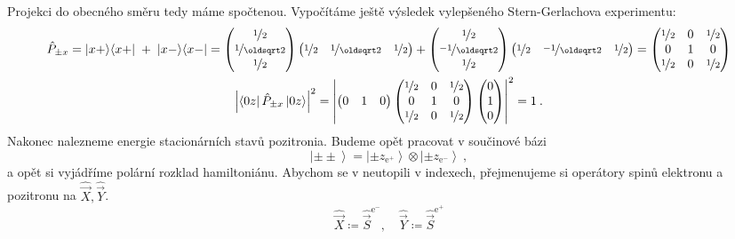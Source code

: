 \documentclass[10pt,a4paper]{article}
\newcommand{\const}[1]{\text{#1}}
\newcommand{\mat}[1]{
    \begin{pmatrix}
        #1
    \end{pmatrix}
}
\newcommand{\bra}[1]{\left< #1 \right|}
\newcommand{\ket}[1]{\left| #1 \right>}
\begin{document}
Projekci do obecného směru tedy máme spočtenou. Vypočítáme ještě výsledek vylepšeného Stern-Gerlachova experimentu:
\begin{gather*}
    \hat P_{\pm x}
    = \ket{x+}\!\bra{x+} \;+\; \ket{x-}\!\bra{x-}
    = \mat{
        \nicefrac{1}{2} \\
        \nicefrac{1}{\oldsqrt 2} \\
        \nicefrac{1}{2}
    } \mat{
        \nicefrac{1}{2} &
        \nicefrac{1}{\oldsqrt 2} &
        \nicefrac{1}{2}
    }
    + \mat{
        \nicefrac{1}{2} \\
        \nicefrac{-1}{\oldsqrt 2} \\
        \nicefrac{1}{2}
    } \mat{
        \nicefrac{1}{2} &
        \nicefrac{-1}{\oldsqrt 2} &
        \nicefrac{1}{2}
    } = \mat{
        \nicefrac{1}{2} & 0 & \nicefrac{1}{2} \\
        0 & 1 & 0 \\
        \nicefrac{1}{2} & 0 & \nicefrac{1}{2}
    }
    \\
    \left| \bra{0z} \hat P_{\pm x} \ket{0z} \right|^2
    =
    \left|
        \mat{0 & 1 & 0}
        \mat{
            \nicefrac{1}{2} & 0 & \nicefrac{1}{2} \\
            0 & 1 & 0 \\
            \nicefrac{1}{2} & 0 & \nicefrac{1}{2}
        }
        \mat{0 \\ 1 \\ 0}
    \right|^2
    = 1
    \: .
\end{gather*}
Nakonec nalezneme energie stacionárních stavů pozitronia. Budeme opět pracovat v součinové bázi
\begin{equation*}
    \ket{\pm\pm} = \ket{\pm z_{\const{e}^+}} \otimes \ket{\pm z_{\const{e}^-}} \: ,
\end{equation*}
a opět si vyjádříme polární  rozklad hamiltoniánu. Abychom se v neutopili v indexech, přejmenujeme si operátory spinů elektronu a pozitronu na $\hat{\vec X}, \hat{\vec Y}$.
\begin{equation*}
    \hat{\vec X} \coloneqq \hat{\vec S}^{\const{e}^-},
    \quad
    \hat{\vec Y} \coloneqq \hat{\vec S}^{\const{e}^+}
\end{equation*}
\end{document}
